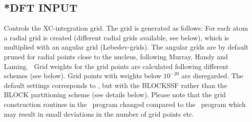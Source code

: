 \subsection{*DFT INPUT}\label{subsec:dftinput}
Controls the XC-integration grid. 
The grid is generated as follows: 
For each atom a radial grid is created (different radial grids available, see below), 
which is multiplied with an angular grid (Lebedev-grids).
The angular grids are by default pruned for radial points close to the nucleus,  
following Murray, Handy and Laming.~\cite{dft-int:pruning} 
Grid weights for the grid points are calculated following different schemes (see below). 
Grid points with weights below $10^{-20}$ are disregarded. The default settings 
corresponds to , but with the BLOCKSSF rather than the BLOCK partitioning scheme
(see details below).
Please note that the grid construction routines in the \lsdalton\
program changed compared to the \dalton\ program which may result in small deviations in the number of grid points etc.
